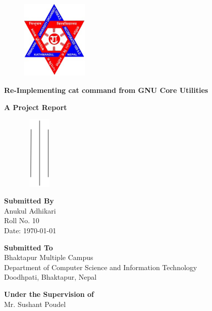 \pagestyle{empty}
\begin{figure}[tp] %
\centering
\includegraphics[width=90pt]{../scrot/logo}
\end{figure}
\begin{center}
 {\Large \textbf{{Re-Implementing cat command from GNU Core Utilities}}}\par
 {\large \textbf{{A Project Report}\\}}
\begin{figure}[hbtp]
 \centering
 \includegraphics[width=45pt,height=100pt]{../scrot/vlines}
\end{figure}
  {\Large \textbf{{Submitted By}\\}}
  {\Large Anukul Adhikari\\\large Roll No. 10\\ \large Date: {\today}}\par        
{\Large \textbf{{Submitted To}\\}}
{\large Bhaktapur Multiple Campus \\ Department of Computer Science and Information Technology\\
					Doodhpati, Bhaktapur, Nepal }\par					
{\Large\vspace*{5mm} \textbf {Under the Supervision of}\\
			\vspace*{3mm}\large Mr. Sushant Poudel}\par 
\end{center}
